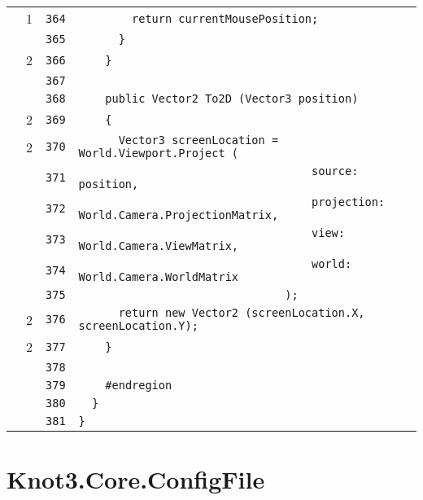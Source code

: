\documentclass[a4paper,10pt]{article}
\begin{document}
\begin{longtable}[l]{lrrl}
\cellcolor{green} & 1 & \verb~364~ & \verb~        return currentMousePosition;~\\
\cellcolor{gray} &  & \verb~365~ & \verb~      }~\\
\cellcolor{green} & 2 & \verb~366~ & \verb~    }~\\
\cellcolor{gray} &  & \verb~367~ & \verb~~\\
\cellcolor{gray} &  & \verb~368~ & \verb~    public Vector2 To2D (Vector3 position)~\\
\cellcolor{green} & 2 & \verb~369~ & \verb~    {~\\
\cellcolor{green} & 2 & \verb~370~ & \verb~      Vector3 screenLocation = World.Viewport.Project (~\\
\cellcolor{gray} &  & \verb~371~ & \verb~                                   source: position,~\\
\cellcolor{gray} &  & \verb~372~ & \verb~                                   projection: World.Camera.ProjectionMatrix,~\\
\cellcolor{gray} &  & \verb~373~ & \verb~                                   view: World.Camera.ViewMatrix,~\\
\cellcolor{gray} &  & \verb~374~ & \verb~                                   world: World.Camera.WorldMatrix~\\
\cellcolor{gray} &  & \verb~375~ & \verb~                               );~\\
\cellcolor{green} & 2 & \verb~376~ & \verb~      return new Vector2 (screenLocation.X, screenLocation.Y);~\\
\cellcolor{green} & 2 & \verb~377~ & \verb~    }~\\
\cellcolor{gray} &  & \verb~378~ & \verb~~\\
\cellcolor{gray} &  & \verb~379~ & \verb~    #endregion~\\
\cellcolor{gray} &  & \verb~380~ & \verb~  }~\\
\cellcolor{gray} &  & \verb~381~ & \verb~}~\\
\end{longtable}
\newpage
\section{Knot3.Core.ConfigFile}
\end{document}
